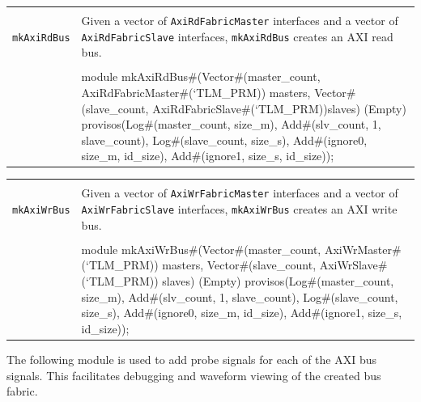 \documentclass[twoside,letterpaper]{article}
\newcommand{\te}[1]{\texttt{#1}}
\newenvironment{libverbatim}
  {\vspace*{-1.0em}
   \verbatim}
  {\endverbatim
  }
\begin{document}
\begin{center}
\begin{tabular}{|p{1 in}|p{5.2 in}|}
\hline 
&\\
\te{mkAxiRdBus}&Given a vector of \te{AxiRdFabricMaster} interfaces and a vector 
of \te{AxiRdFabricSlave} interfaces, \te{mkAxiRdBus} creates an AXI read bus. \\
&\\
\cline{2-2}
&\begin{libverbatim}
module mkAxiRdBus#(Vector#(master_count, 
                           AxiRdFabricMaster#(`TLM_PRM)) masters, 
                   Vector#(slave_count,  
                           AxiRdFabricSlave#(`TLM_PRM))slaves) (Empty)
   provisos(Log#(master_count, size_m), 
            Add#(slv_count, 1, slave_count),
            Log#(slave_count, size_s),
            Add#(ignore0, size_m, id_size),
            Add#(ignore1, size_s, id_size));
\end{libverbatim}
\\
\hline
\end{tabular}
\end{center}



\begin{center}
\begin{tabular}{|p{1 in}|p{5.2 in}|}
\hline 
&\\
\te{mkAxiWrBus}&Given a vector of \te{AxiWrFabricMaster} interfaces and a vector 
of \te{AxiWrFabricSlave} interfaces, \te{mkAxiWrBus} creates an AXI write bus. \\
&\\
\cline{2-2}
&\begin{libverbatim}
module mkAxiWrBus#(Vector#(master_count, 
                           AxiWrMaster#(`TLM_PRM)) masters, 
                   Vector#(slave_count,  
                           AxiWrSlave#(`TLM_PRM)) slaves) (Empty)
   provisos(Log#(master_count, size_m), 
            Add#(slv_count, 1, slave_count),
            Log#(slave_count, size_s),
            Add#(ignore0, size_m, id_size),
            Add#(ignore1, size_s, id_size));
\end{libverbatim}
\\
\hline
\end{tabular}
\end{center}

The following module is used to add probe signals for each of the AXI
bus signals. This facilitates debugging and waveform viewing of the created bus fabric.
\end{document}
